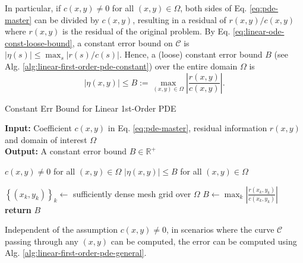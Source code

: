 \documentclass{uai2023}
\newcommand{\Err}{\eta}
\begin{document}
    In particular, if $c(x, y) \neq 0$ for all $(x, y) \in \Omega$, both sides of Eq. \ref{eq:pde-master} can be divided by $c(x, y)$, resulting in a residual of $r(x, y)/c(x, y)$ where $r(x, y)$ is the residual of the original problem. 
    By Eq. \ref{eq:linear-ode-const-loose-bound}, a constant error bound on $\mathcal{C}$ is $|\Err(s)| \leq \max_{s}\left|r(s)/c(s)\right|$. 
    Hence, a (loose) constant error bound $B$ (see Alg. \ref{alg:linear-first-order-pde-constant}) over the entire domain $\Omega$ is
    {
        \small
        \begin{equation}
            |\Err(x, y)| \leq B :=\max_{(x, y)\in \Omega}\left|\frac{r(x, y)}{c(x, y)}\right|.
        \end{equation}
    }

    \begin{algorithm}
        \small
        \caption{Constant Err Bound for Linear 1st-Order PDE}\label{alg:linear-first-order-pde-constant}
        \textbf{Input:} Coefficient $c(x, y)$ in Eq. \ref{eq:pde-master}, residual information $r(x, y)$ and domain of interest $\Omega$\\
        \textbf{Output:} A constant error bound $B \in \mathbb{R}^+$
        \begin{algorithmic}
            \Require $c(x, y) \neq 0$ for all $(x, y) \in \Omega$
            \Ensure $|\Err(x, y)| \leq B$ for all $(x, y) \in \Omega$

            \State $\left\{(x_k, y_k)\right\}_{k} \gets$ sufficiently dense mesh grid over $\Omega$
            \State $\displaystyle B \gets \max_{k} \left| \frac{r(x_k, y_k)}{c(x_k, y_k)}\right|$
            \State \textbf{return} $B$
        \end{algorithmic}
    \end{algorithm}

    Independent of the assumption $c(x, y)\neq 0$, in scenarios where the curve $\mathcal{C}$ passing through any $(x, y)$ can be computed, the error can be computed using Alg. \ref{alg:linear-first-order-pde-general}.
\end{document}

